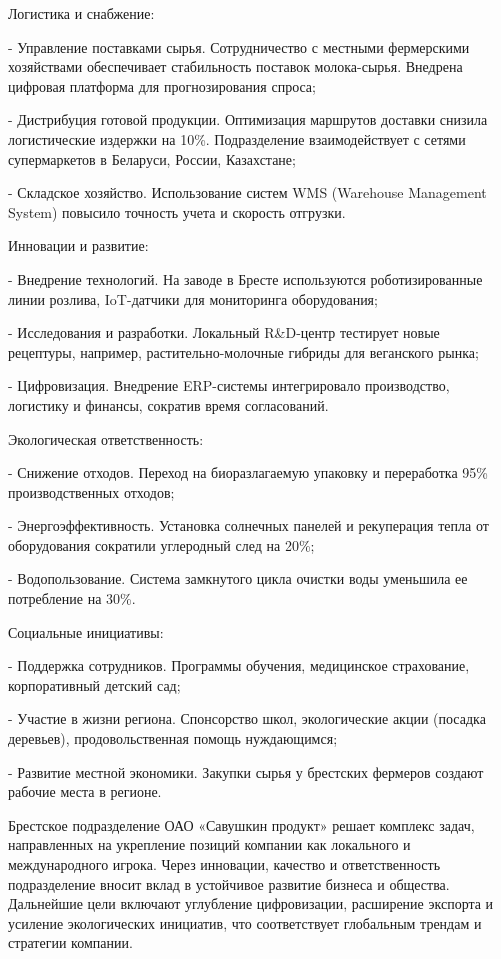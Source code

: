 {  \par \redline Логистика и снабжение:
  \par \redline - Управление поставками сырья. Сотрудничество с местными фермерскими хозяйствами обеспечивает стабильность поставок молока-сырья. Внедрена цифровая платформа для прогнозирования спроса;
  \par \redline - Дистрибуция готовой продукции. Оптимизация маршрутов доставки снизила логистические издержки на 10\%. Подразделение взаимодействует с сетями супермаркетов в Беларуси, России, Казахстане;
  \par \redline - Складское хозяйство. Использование систем WMS (Warehouse Management System) повысило точность учета и скорость отгрузки.

  \par \redline Инновации и развитие:
  \par \redline - Внедрение технологий. На заводе в Бресте используются роботизированные линии розлива, IoT-датчики для мониторинга оборудования;
  \par \redline - Исследования и разработки. Локальный R\&D-центр тестирует новые рецептуры, например, растительно-молочные гибриды для веганского рынка;
  \par \redline - Цифровизация. Внедрение ERP-системы интегрировало производство, логистику и финансы, сократив время согласований.

  \par \redline Экологическая ответственность:
  \par \redline - Снижение отходов. Переход на биоразлагаемую упаковку и переработка 95\% производственных отходов;
  \par \redline - Энергоэффективность. Установка солнечных панелей и рекуперация тепла от оборудования сократили углеродный след на 20\%;
  \par \redline - Водопользование. Система замкнутого цикла очистки воды уменьшила ее потребление на 30\%.

  \par \redline Социальные инициативы:
  \par \redline - Поддержка сотрудников. Программы обучения, медицинское страхование, корпоративный детский сад;
  \par \redline - Участие в жизни региона. Спонсорство школ, экологические акции (посадка деревьев), продовольственная помощь нуждающимся;
  \par \redline - Развитие местной экономики. Закупки сырья у брестских фермеров создают рабочие места в регионе.

  \par \redline Брестское подразделение ОАО «Савушкин продукт» решает комплекс задач, направленных на укрепление позиций компании как локального и международного игрока. Через инновации, качество и ответственность подразделение вносит вклад в устойчивое развитие бизнеса и общества. Дальнейшие цели включают углубление цифровизации, расширение экспорта и усиление экологических инициатив, что соответствует глобальным трендам и стратегии компании.

  \par
}


